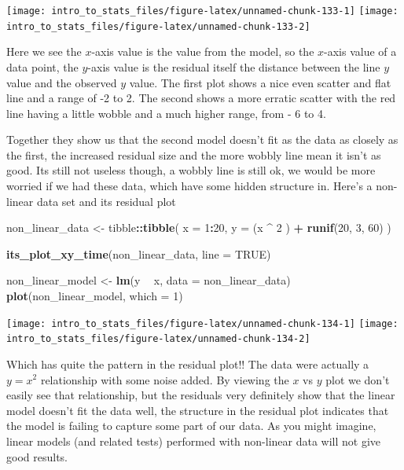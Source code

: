 \documentclass[
]{book}
\newenvironment{Shaded}{\begin{snugshade}}{\end{snugshade}}
\newcommand{\DataTypeTok}[1]{\textcolor[rgb]{0.13,0.29,0.53}{#1}}
\newcommand{\DecValTok}[1]{\textcolor[rgb]{0.00,0.00,0.81}{#1}}
\newcommand{\KeywordTok}[1]{\textcolor[rgb]{0.13,0.29,0.53}{\textbf{#1}}}
\newcommand{\NormalTok}[1]{#1}
\newcommand{\OperatorTok}[1]{\textcolor[rgb]{0.81,0.36,0.00}{\textbf{#1}}}
\newcommand{\OtherTok}[1]{\textcolor[rgb]{0.56,0.35,0.01}{#1}}
\newcommand{\StringTok}[1]{\textcolor[rgb]{0.31,0.60,0.02}{#1}}
\begin{document}
\texttt{[image: intro\_to\_stats\_files/figure-latex/unnamed-chunk-133-1]} \texttt{[image: intro\_to\_stats\_files/figure-latex/unnamed-chunk-133-2]}

Here we see the \(x\)-axis value is the value from the model, so the \(x\)-axis value of a data point, the \(y\)-axis value is the residual itself the distance between the line \(y\) value and the observed \(y\) value. The first plot shows a nice even scatter and flat line and a range of -2 to 2. The second shows a more erratic scatter with the red line having a little wobble and a much higher range, from - 6 to 4.

Together they show us that the second model doesn't fit as the data as closely as the first, the increased residual size and the more wobbly line mean it isn't as good. Its still not useless though, a wobbly line is still ok, we would be more worried if we had these data, which have some hidden structure in. Here's a non-linear data set and its residual plot

\begin{Shaded}
\begin{Highlighting}[]
\NormalTok{non_linear_data <-}\StringTok{ }\NormalTok{tibble}\OperatorTok{::}\KeywordTok{tibble}\NormalTok{(}
  \DataTypeTok{x =} \DecValTok{1}\OperatorTok{:}\DecValTok{20}\NormalTok{,}
  \DataTypeTok{y =}\NormalTok{ (x }\OperatorTok{^}\StringTok{ }\DecValTok{2}\NormalTok{ ) }\OperatorTok{+}\StringTok{ }\KeywordTok{runif}\NormalTok{(}\DecValTok{20}\NormalTok{, }\DecValTok{3}\NormalTok{, }\DecValTok{60}\NormalTok{)}
\NormalTok{)}

\KeywordTok{its_plot_xy_time}\NormalTok{(non_linear_data, }\DataTypeTok{line =} \OtherTok{TRUE}\NormalTok{)}

\NormalTok{non_linear_model <-}\StringTok{ }\KeywordTok{lm}\NormalTok{(y }\OperatorTok{~}\StringTok{ }\NormalTok{x, }\DataTypeTok{data =}\NormalTok{ non_linear_data)}
\KeywordTok{plot}\NormalTok{(non_linear_model, }\DataTypeTok{which =} \DecValTok{1}\NormalTok{)}
\end{Highlighting}
\end{Shaded}

\texttt{[image: intro\_to\_stats\_files/figure-latex/unnamed-chunk-134-1]} \texttt{[image: intro\_to\_stats\_files/figure-latex/unnamed-chunk-134-2]}

Which has quite the pattern in the residual plot!! The data were actually a \(y = x^2\) relationship with some noise added. By viewing the \(x\) vs \(y\) plot we don't easily see that relationship, but the residuals very definitely show that the linear model doesn't fit the data well, the structure in the residual plot indicates that the model is failing to capture some part of our data. As you might imagine, linear models (and related tests) performed with non-linear data will not give good results.
\end{document}
